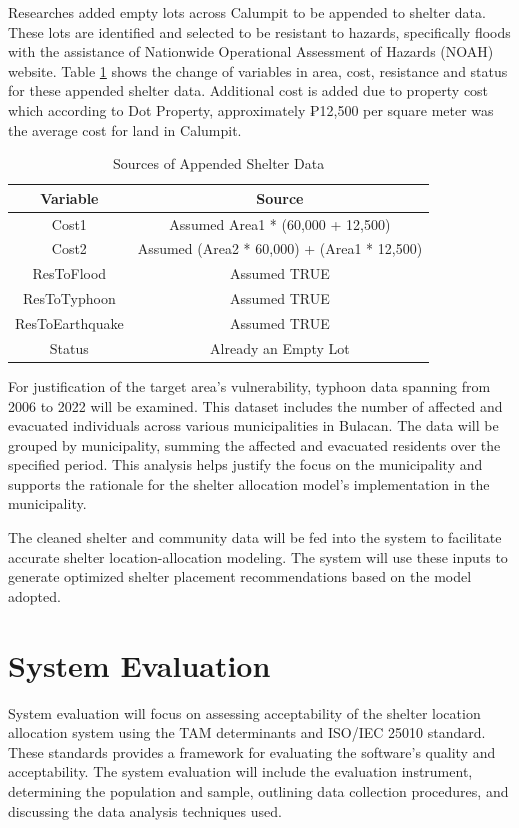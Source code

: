 	Researches added empty lots across Calumpit to be appended to shelter data. These lots are identified and selected to be resistant to hazards, specifically floods with the assistance of Nationwide Operational Assessment of Hazards (NOAH) website. Table \ref{AppendData} shows the change of variables in area, cost, resistance and status for these appended shelter data. Additional cost is added due to property cost which according to Dot Property, approximately ₱12,500 per square meter was the average cost for land in Calumpit.
	
	\begin{table}[h]
		\centering
		\caption{Sources of Appended Shelter Data}
		\label{AppendData}
			\begin{tabular}{|c|c|}
				\hline
				\multicolumn{1}{|c|}{\textbf{Variable}} & 
				\multicolumn{1}{c|}{\textbf{Source}} \\ \hline
				Cost1     & Assumed Area1 * (60,000 + 12,500) \\ \hline
				Cost2     & Assumed (Area2 * 60,000) + (Area1 * 12,500) \\ \hline
				ResToFlood     & Assumed TRUE \\ \hline
				ResToTyphoon    & Assumed TRUE \\ \hline
				ResToEarthquake     & Assumed TRUE \\ \hline
				Status     & Already an Empty Lot \\ \hline
				
			\end{tabular}
	\end{table}
	
	For justification of the target area’s vulnerability, typhoon data spanning from 2006 to 2022 will be examined. This dataset includes the number of affected and evacuated individuals across various municipalities in Bulacan. The data will be grouped by municipality, summing the affected and evacuated residents over the specified period. This analysis helps justify the focus on the municipality and supports the rationale for the shelter allocation model’s implementation in the municipality.
	
	The cleaned shelter and community data will be fed into the system to facilitate accurate shelter location-allocation modeling. The system will use these inputs to generate optimized shelter placement recommendations based on the model adopted.
	
	
\section{System Evaluation}
	System evaluation will focus on assessing acceptability of the shelter location allocation system using the TAM determinants and ISO/IEC 25010 standard. These standards provides a framework for evaluating the software's quality and acceptability. The system evaluation will include the evaluation instrument, determining the population and sample, outlining data collection procedures, and discussing the data analysis techniques used.

